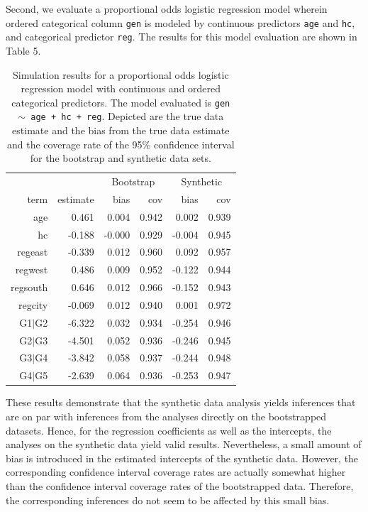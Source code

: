 \documentclass[psych,article,submit,moreauthors,pdftex]{mdpi}
\begin{document}
Second, we evaluate a proportional odds logistic regression model
wherein ordered categorical column \texttt{gen} is modeled by continuous
predictors \texttt{age} and \texttt{hc}, and categorical predictor
\texttt{reg}. The results for this model evaluation are shown in Table
5.

\begin{table}[H]
\caption{Simulation results for a proportional odds logistic regression model with continuous and ordered categorical predictors. The model evaluated is \texttt{gen $\sim$ age + hc + reg}. Depicted are the true data estimate and the bias from the true data estimate and the coverage rate of the 95\% confidence interval for the bootstrap and synthetic data sets.}
\centering
\begin{tabular}{rrrrrr}
  \hline
 & & \multicolumn{2}{c}{Bootstrap} & \multicolumn{2}{c}{Synthetic}\\
 term & estimate & bias & cov & bias & cov \\ 
  \hline
  age & 0.461 & 0.004 & 0.942 & 0.002 & 0.939 \\
  hc & -0.188 & -0.000 & 0.929 & -0.004 & 0.945 \\
  regeast & -0.339 & 0.012 & 0.960 & 0.092 & 0.957\\
  regwest & 0.486 & 0.009 & 0.952 & -0.122 & 0.944\\
  regsouth & 0.646 & 0.012 & 0.966 & -0.152 & 0.943 \\
  regcity & -0.069 & 0.012 & 0.940 & 0.001 & 0.972 \\
  G1$|$G2 & -6.322 & 0.032 & 0.934 & -0.254 & 0.946 \\
  G2$|$G3 & -4.501 & 0.052 & 0.936 & -0.246 & 0.945 \\
  G3$|$G4 & -3.842 & 0.058 & 0.937 & -0.244 & 0.948 \\
  G4$|$G5 & -2.639 & 0.064 & 0.936 & -0.253 & 0.947 \\
   \hline
\end{tabular}
\end{table}

These results demonstrate that the synthetic data analysis yields
inferences that are on par with inferences from the analyses directly on
the bootstrapped datasets. Hence, for the regression coefficients as
well as the intercepts, the analyses on the synthetic data yield valid
results. Nevertheless, a small amount of bias is introduced in the
estimated intercepts of the synthetic data. However, the corresponding
confidence interval coverage rates are actually somewhat higher than the
confidence interval coverage rates of the bootstrapped data. Therefore,
the corresponding inferences do not seem to be affected by this small
bias.
\end{document}
